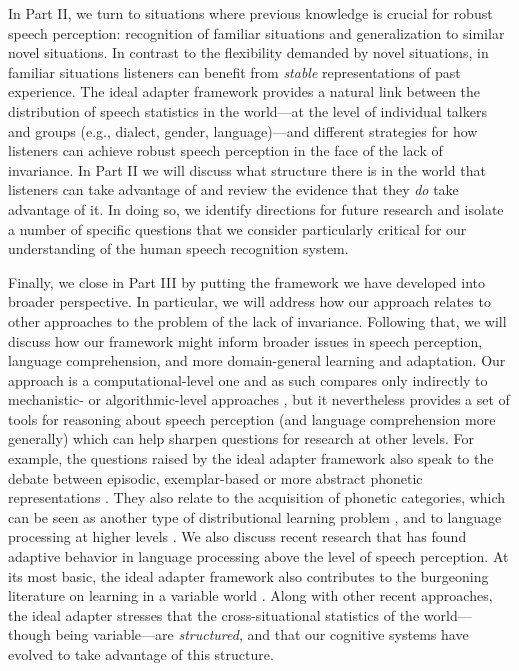 In Part II, we turn to situations where previous knowledge is crucial for robust speech perception: recognition of familiar situations and generalization to similar novel situations.  In contrast to the flexibility demanded by novel situations, in familiar situations listeners can benefit from \emph{stable} representations of past experience.  The ideal adapter framework provides a natural link between the distribution of speech statistics in the world---at the level of individual talkers and groups (e.g., dialect, gender, language)---and different strategies for how listeners can achieve robust speech perception in the face of the lack of invariance.  In Part II we will discuss what structure there is in the world that listeners can take advantage of and review the evidence that they \emph{do} take advantage of it. In doing so, we identify directions for future research and isolate a number of specific questions that we consider particularly critical for our understanding of the human speech recognition system.

Finally, we close in Part III by putting the framework we have developed into broader perspective.  In particular, we will address how our approach relates to other approaches to the problem of the lack of invariance.  Following that, we will discuss how our framework might inform broader issues in speech perception, language comprehension, and more domain-general learning and adaptation. Our approach is a computational-level one and as such compares only indirectly to mechanistic- or algorithmic-level approaches \autocite{Marr1982}, but it nevertheless provides a set of tools for reasoning about speech perception (and language comprehension more generally) which can help sharpen questions for research at other levels.  For example, the questions raised by the ideal adapter framework also speak to the debate between episodic, exemplar-based or more abstract phonetic representations \autocite{Johnson1997,Goldinger1998,McClelland1986,Norris2008,Pierrehumbert2003}. They also relate to the acquisition of phonetic categories, which can be seen as another type of distributional learning problem \autocite{Maye2002,McMurray2009,Vallabha2007}, and to language processing at higher levels \autocite[e.g.,][]{Fine2013,Grodner2011,Kamide2012,Kurumada2012,Kurumada2014}.  We also discuss recent research that has found adaptive behavior in language processing above the level of speech perception. At its most basic, the ideal adapter framework also contributes to the burgeoning literature on learning in a variable world \autocites[e.g., change detection][]{Gallistel2001}[hierarchical reinforcement learning][]{Botvinick2012}[motor learning][]{Kording2007a}.  Along with other recent approaches, the ideal adapter stresses that the cross-situational statistics of the world---though being variable---are \emph{structured}, and that our cognitive systems have evolved to take advantage of this structure.
\label{r2-outline-parts-end} 

